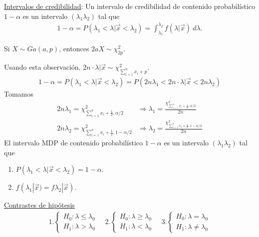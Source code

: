 \underline{Intervalos de credibilidad}: Un intervalo de credibilidad de contenido probabilístico $1-\alpha$ es un intervalo $(\lambda_1\lambda_2)$ tal que
\begin{align*}
    1 - \alpha = P(\lambda_1 < \lambda | \vec{x} < \lambda_2) = \int_{\lambda_1}^{\lambda_2} f(\lambda | \vec{x}) \ d\lambda.
\end{align*}
\begin{obs}
    Si $X \sim Ga(a,p)$, entonces $2aX \sim \chi^2_{2p}$.
\end{obs}
Usando esta observación, $2n \cdot \lambda | \vec{x} \sim \chi^2_{\sum_{i=1}^{n} x_i + p }$.
\begin{align*}
    1 - \alpha = P(\lambda_1 < \lambda | \vec{x} < \lambda_2) = P(2n\lambda_1 < 2n\cdot\lambda | \vec{x} < 2n \lambda_2)
\end{align*}
Tomamos
\begin{align*}
    2n\lambda_1 = \chi^2_{\sum_{i=1}^{n} x_i + \frac{1}{2}, \alpha/2 }    & \Longrightarrow \lambda_1 = \frac{\chi^2_{\sum_{i=1}^{n} x_i + \frac{1}{2}, \alpha/2 }}{2n}    \\
    2n\lambda_2 = \chi^2_{\sum_{i=1}^{n} x_i + \frac{1}{2}, 1- \alpha/2 } & \Longrightarrow \lambda_2 = \frac{\chi^2_{\sum_{i=1}^{n} x_i + \frac{1}{2}, 1- \alpha/2 }}{2n}
\end{align*}
El intervalo MDP de contenido probabilístico $1-\alpha$ es un intervalo $(\lambda_1\lambda_2)$ tal que
\begin{enumerate}
    \item $P(\lambda_1 < \lambda| \vec{x} < \lambda_2) = 1 - \alpha$.
    \item $f(\lambda_1 | \vec{x}) = f\lambda_2 | \vec{x})$.
\end{enumerate}
\underline{Contrastes de hipótesis}
\begin{align*}
    1. \begin{cases}
           H_0 : \lambda \leq \lambda_0 \\
           H_1 : \lambda > \lambda_0
       \end{cases} \quad     2.\begin{cases}
                                   H_0 : \lambda \ge \lambda_0 \\
                                   H_1 : \lambda < \lambda_0
                               \end{cases} \quad     3.\begin{cases}
                                                           H_0 : \lambda = \lambda_0 \\
                                                           H_1 : \lambda \not = \lambda_0
                                                       \end{cases}
\end{align*}


